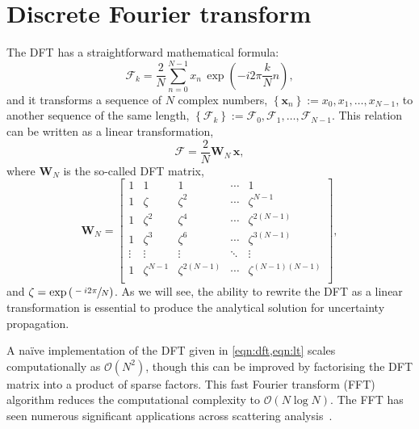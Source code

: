\documentclass[reprint,
               superscriptaddress,
               nobibnotes,
               amsmath,
               amssymb,
               aps,
               hidelinks, 
               pre]{revtex4-2}
\begin{document}
\section{Discrete Fourier transform} 

The DFT has a straightforward mathematical formula: 
%
\begin{equation}
    \mathcal{F}_k = \frac{2}{N} \sum_{n=0}^{N-1} x_n\,\exp{\left(-i2\pi\frac{k}{N}n\right)},
    \label{eqn:dft}
\end{equation}
%
and it transforms a sequence of $N$ complex numbers, $\left\{\mathbf{x}_n\right\} := x_0, x_1, \ldots, x_{N-1}$, to another sequence of the same length, $\left\{\bm{\mathcal{F}}_k\right\} := \mathcal{F}_0, \mathcal{F}_1, \ldots, \mathcal{F}_{N-1}$. 
This relation can be written as a linear transformation, 
%
\begin{equation}
    \bm{\mathcal{F}} = \frac{2}{N} \mathbf{W}_N\,\mathbf{x},
    \label{eqn:lt}
\end{equation}
%
where $\mathbf{W}_N$ is the so-called DFT matrix,
%
\begin{equation}
    \mathbf{W}_N = 
    \begin{bmatrix}
        1 & 1 & 1 & \cdots & 1 \\
        1 & \zeta & \zeta^2 & \cdots & \zeta^{N-1} \\
        1 & \zeta^2 & \zeta^4 & \cdots & \zeta^{2(N-1)} \\
        1 & \zeta^3 & \zeta^6 & \cdots & \zeta^{3(N-1)} \\
        \vdots & \vdots & \vdots & \ddots & \vdots \\
        1 & \zeta^{N-1} & \zeta^{2(N-1)} & \cdots & \zeta^{(N-1)(N-1)} \\
    \end{bmatrix},
    \label{eqn:mat}
\end{equation}
%
and $\zeta = \exp{\left(\sfrac{-i2\pi}{N}\right)}$.
As we will see, the ability to rewrite the DFT as a linear transformation is essential to produce the analytical solution for uncertainty propagation. 

A naïve implementation of the DFT given in \cref{eqn:dft,eqn:lt} scales computationally as $\mathcal{O}(N^2)$, though this can be improved by factorising the DFT matrix into a product of sparse factors. 
This fast Fourier transform (FFT) algorithm reduces the computational complexity to $\mathcal{O}(N\log{N})$. 
The FFT has seen numerous significant applications across scattering analysis~\cite{TenEyck1973, Kneller1995}.
\end{document}
